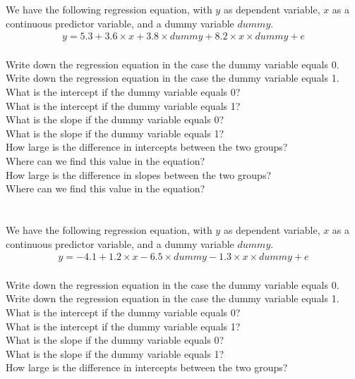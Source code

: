 \documentclass[]{report}\usepackage[]{graphicx}\usepackage[]{color}
\begin{document}
We have the following regression equation, with $y$ as dependent variable, $x$ as a continuous predictor variable, and a dummy variable $dummy$.
\\
\begin{eqnarray} 
y = 5.3 + 3.6  \times x + 3.8  \times dummy + 8.2  \times x  \times dummy + e \nonumber
\end{eqnarray}
\\
Write down the regression equation in the case the dummy variable equals 0.\\
Write down the regression equation in the case the dummy variable equals 1.\\
What is the intercept if the dummy variable equals 0?\\
What is the intercept if the dummy variable equals 1?\\
What is the slope if the dummy variable equals 0?\\
What is the slope if the dummy variable equals 1?\\
How large is the difference in intercepts between the two groups?\\
Where can we find this value in the equation?\\
How large is the difference in slopes between the two groups?\\
Where can we find this value in the equation?\\
\\
\\
We have the following regression equation, with $y$ as dependent variable, $x$ as a continuous predictor variable, and a dummy variable $dummy$.
\\
\begin{eqnarray} 
y = - 4.1 + 1.2  \times x - 6.5  \times dummy - 1.3 \times x \times dummy + e \nonumber
\end{eqnarray}
\\
Write down the regression equation in the case the dummy variable equals 0.\\
Write down the regression equation in the case the dummy variable equals 1.\\
What is the intercept if the dummy variable equals 0?\\
What is the intercept if the dummy variable equals 1?\\
What is the slope if the dummy variable equals 0?\\
What is the slope if the dummy variable equals 1?\\
How large is the difference in intercepts between the two groups?\\ 
\end{document}
